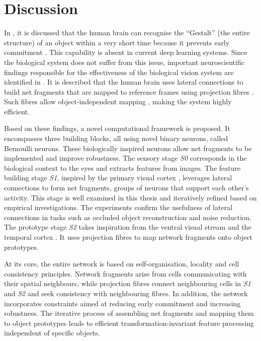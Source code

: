 \section{Discussion}
In , it is discussed that the human brain can recognise the ``Gestalt'' (the entire structure) of an object within a very short time \cite{ellis_source_1938, kohler_gestalt_1992, wagemans_century_2012, hamlyn_psychology_2017} because it prevents early commitment \cite{marr_vision_2010}.
This capability is absent in current deep learning systems.
Since the biological system does not suffer from this issue, important neuroscientific findings responsible for the effectiveness of the biological vision system are identified in .
It is described that the human brain uses lateral connections  to build net fragments  that are mapped to reference frames using projection fibres .
Such fibres allow object-independent mapping , making the system highly efficient.

Based on these findings, a novel computational framework is proposed.
It encompasses three building blocks, all using novel binary neurons, called Bernoulli neurons.
These biologically inspired neurons allow net fragments to be implemented and improve robustness.
The sensory stage \emph{S0} corresponds in the biological context to the eyes and extracts features from images.
The feature building stage \emph{S1}, inspired by the primary visual cortex \cite{tong_primary_2003, grill-spector_human_2004}, leverages lateral connections to form net fragments, groups of neurons that support each other's activity.
This stage is well examined in this thesis and iteratively refined based on empirical investigations.
The experiments confirm the usefulness of lateral connections in tasks such as occluded object reconstruction and noise reduction.
The prototype stage \emph{S2} takes inspiration from the ventral visual stream \cite{goodale_separate_1992} and the temporal cortex \cite{miyashita_inferior_1993, conway_organization_2018}.
It uses projection fibres to map network fragments onto object prototypes.

At its core, the entire network is based on self-organisation, locality and cell consistency principles.
Network fragments arise from cells communicating with their spatial neighbours, while projection fibres connect neighbouring cells in \emph{S1} and \emph{S2} and seek consistency with neighbouring fibres.
In addition, the network incorporates constraints aimed at reducing early commitment and increasing robustness. The iterative process of assembling net fragments and mapping them to object prototypes leads to efficient transformation-invariant feature processing independent of specific objects.

